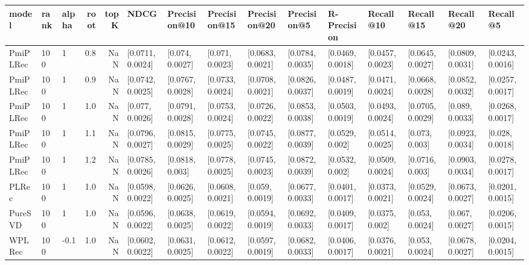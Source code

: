 \begin{tabular}{lllrrllllllllll}
\toprule
     model & rank & alpha &  root &  topK &              NDCG &      Precision@10 &      Precision@15 &      Precision@20 &       Precision@5 &       R-Precision &         Recall@10 &         Recall@15 &         Recall@20 &          Recall@5 \\
\midrule
  PmiPLRec &  100 &     1 &   0.8 &   NaN &  [0.0711, 0.0024] &   [0.074, 0.0027] &   [0.071, 0.0023] &  [0.0683, 0.0021] &  [0.0784, 0.0035] &  [0.0469, 0.0018] &  [0.0457, 0.0023] &  [0.0645, 0.0027] &  [0.0809, 0.0031] &  [0.0243, 0.0016] \\
  PmiPLRec &  100 &     1 &   0.9 &   NaN &  [0.0742, 0.0025] &  [0.0767, 0.0028] &  [0.0733, 0.0024] &  [0.0708, 0.0021] &  [0.0826, 0.0037] &  [0.0487, 0.0019] &  [0.0471, 0.0024] &  [0.0668, 0.0028] &  [0.0852, 0.0032] &  [0.0257, 0.0017] \\
  PmiPLRec &  100 &     1 &   1.0 &   NaN &   [0.077, 0.0026] &  [0.0791, 0.0028] &  [0.0753, 0.0024] &  [0.0726, 0.0022] &  [0.0853, 0.0038] &  [0.0503, 0.0019] &  [0.0493, 0.0024] &  [0.0705, 0.0029] &   [0.089, 0.0033] &  [0.0268, 0.0017] \\
  PmiPLRec &  100 &     1 &   1.1 &   NaN &  [0.0796, 0.0027] &  [0.0815, 0.0029] &  [0.0775, 0.0025] &  [0.0745, 0.0022] &  [0.0877, 0.0039] &   [0.0529, 0.002] &  [0.0514, 0.0025] &    [0.073, 0.003] &  [0.0923, 0.0034] &   [0.028, 0.0018] \\
  PmiPLRec &  100 &     1 &   1.2 &   NaN &  [0.0785, 0.0026] &   [0.0818, 0.003] &  [0.0778, 0.0025] &  [0.0745, 0.0023] &  [0.0872, 0.0039] &   [0.0532, 0.002] &  [0.0509, 0.0024] &   [0.0716, 0.003] &  [0.0903, 0.0034] &  [0.0278, 0.0017] \\
     PLRec &  100 &     1 &   1.0 &   NaN &  [0.0598, 0.0022] &  [0.0626, 0.0025] &  [0.0608, 0.0021] &   [0.059, 0.0019] &  [0.0677, 0.0033] &  [0.0401, 0.0017] &  [0.0373, 0.0021] &  [0.0529, 0.0024] &  [0.0673, 0.0027] &  [0.0201, 0.0015] \\
   PureSVD &  100 &     1 &   1.0 &   NaN &  [0.0596, 0.0022] &  [0.0638, 0.0025] &  [0.0619, 0.0022] &  [0.0594, 0.0019] &  [0.0692, 0.0033] &  [0.0409, 0.0017] &   [0.0375, 0.002] &   [0.053, 0.0024] &   [0.067, 0.0027] &  [0.0206, 0.0015] \\
    WPLRec &  100 &  -0.1 &   1.0 &   NaN &  [0.0602, 0.0022] &  [0.0631, 0.0025] &  [0.0612, 0.0022] &  [0.0597, 0.0019] &  [0.0682, 0.0033] &  [0.0406, 0.0017] &  [0.0376, 0.0021] &   [0.053, 0.0024] &  [0.0678, 0.0027] &  [0.0204, 0.0015] \\

\end{tabular}
